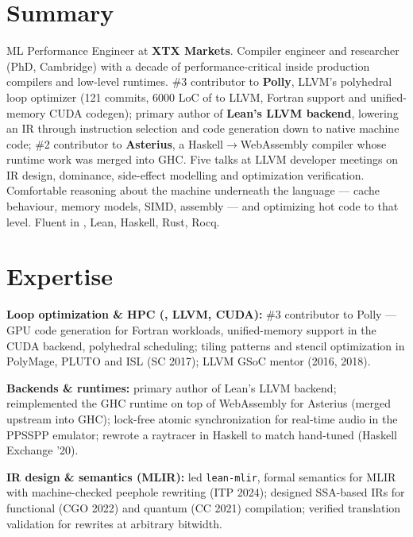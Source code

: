 \documentclass[9pt,a4paper]{extarticle}
\begin{document}
\cvheader

\section{Summary}
ML Performance Engineer at \textbf{XTX Markets}.
Compiler engineer and researcher (PhD, Cambridge) with a decade of performance-critical \cpp{}
inside production compilers and low-level runtimes.
\#3 contributor to \textbf{Polly}, LLVM's polyhedral loop optimizer (121 commits, 6000 LoC of
\cpp{} to LLVM, Fortran support and unified-memory CUDA codegen);
primary author of \textbf{Lean's LLVM backend}, lowering an IR through instruction selection and
code generation down to native machine code;
\#2 contributor to \textbf{Asterius}, a Haskell$\to$WebAssembly compiler whose runtime work was
merged into GHC.
Five talks at LLVM developer meetings on IR design, dominance, side-effect modelling and
optimization verification.
Comfortable reasoning about the machine underneath the language --- cache behaviour, memory
models, SIMD, assembly --- and optimizing hot code to that level.
Fluent in \cpp{}, Lean, Haskell, Rust, Rocq.

\section{Expertise}
\begin{records}
\item \textbf{Loop optimization \& HPC (\cpp{}, LLVM, CUDA):} \#3 contributor to Polly ---
GPU code generation for Fortran workloads, unified-memory support in the CUDA backend,
polyhedral scheduling; tiling patterns and stencil optimization in PolyMage, PLUTO and ISL
(SC 2017); LLVM GSoC mentor (2016, 2018).
\item \textbf{Backends \& runtimes:} primary author of Lean's LLVM backend; reimplemented the
GHC runtime on top of WebAssembly for Asterius (merged upstream into GHC); lock-free atomic
synchronization for real-time audio in the PPSSPP \cpp{} emulator; rewrote a raytracer in Haskell
to match hand-tuned \cpp{} (Haskell Exchange '20).
\item \textbf{IR design \& semantics (MLIR):} led \texttt{lean-mlir}, formal semantics for MLIR
with machine-checked peephole rewriting (ITP 2024); designed SSA-based IRs for functional
(CGO 2022) and quantum (CC 2021) compilation; verified translation validation for rewrites at
arbitrary bitwidth.
\end{records}
\end{document}
